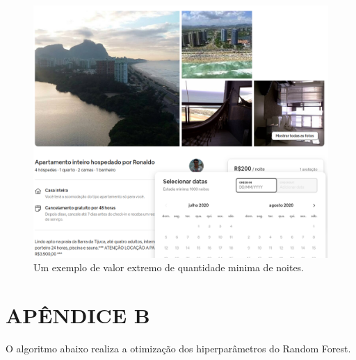 \documentclass[
	12pt,				%
	a4paper,		%
	oneside,    %
	chapter=TITLE,		   %
	section=TITLE,		   %
	subsection=TITLE,	   %
	subsubsection=TITLE, %
	english,			%
	french,				%
	spanish,			%
	brazil,				%
]{abntex2}
\begin{document}
\begin{figure}
\centering
\includegraphics[width=\textwidth,height=0.5\textheight]{../fig/exemplo_periodo_airbnb.png}
\caption{Um exemplo de valor extremo de quantidade minima de
noites.\label{fig:minima_noites}}
\end{figure}

\hypertarget{apuxeandice-b}{%
\chapter*{APÊNDICE B}\label{apuxeandice-b}}

O algoritmo abaixo realiza a otimização dos hiperparâmetros do Random
Forest.
\end{document}
